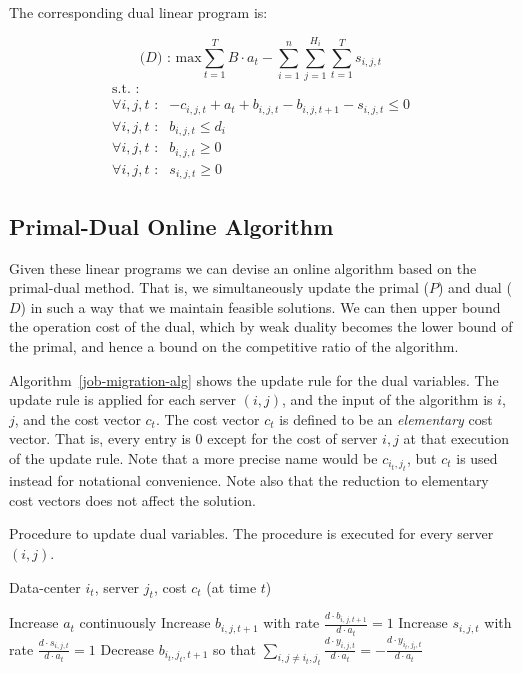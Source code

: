 The corresponding dual linear program is:

\[
\textrm{($D$) : max}   \sum^{T}_{t=1}B \cdot a_t - \sum^{n}_{i=1}\sum^{H_i}_{j=1}\sum^{T}_{t=1}s_{i,j,t}
\]
\[
	\begin{array}{rc}
	\textrm{s.t. :} & \\
		\forall i,j,t \textrm{ :}	    & -c_{i,j,t} + a_t + b_{i,j,t} - b_{i,j,t+1} - s_{i,j,t} \leq 0 \\
		\forall i,j,t \textrm{ :}	    & b_{i,j,t} \leq d_i \\
		\forall i,j,t \textrm{ :}	    & b_{i,j,t} \geq 0 \\
		\forall i,j,t \textrm{ :}	    & s_{i,j,t} \geq 0
	\end{array}
\]

\subsection{Primal-Dual Online Algorithm}
\label{pd-alg}

Given these  linear programs we can devise an online algorithm based on the primal-dual method.
That is, we simultaneously update the primal ($P$) and dual ($D$) in such a way that we maintain feasible solutions.
We can then upper bound the operation cost of the dual, which by weak duality becomes the lower bound of the primal, and hence a bound on the competitive ratio of the algorithm.

Algorithm~\ref{job-migration-alg} shows the update rule for the dual variables.
The update rule is applied for each server $(i,j)$, and the input of the algorithm is $i$, $j$, and the cost vector $c_t$. 
The cost vector $c_t$ is defined to be an \emph{elementary} cost vector. That is, every entry is $0$ except for the cost of server $i,j$ at that execution of the update rule.
Note that a more precise name would be $c_{i_t,j_t}$, but $c_t$ is used instead for notational convenience.
Note also that the reduction to elementary cost vectors does not affect the solution.

\begin{algorithm}
\caption{Procedure to update dual variables. The procedure is executed for every server $(i,j)$.}
\label{job-migration-alg}
\begin{algorithmic}[1]
\REQUIRE Data-center $i_t$, server $j_t$, cost $c_t$ (at time $t$)

 \STATE Increase $a_t$ continuously 
  \STATE Increase $b_{i,j,t+1}$ with rate $\frac{d \cdot b_{i,j,t+1}}{d \cdot a_t} = 1$
 \ENDFOR
  \STATE Increase $s_{i,j,t}$ with rate $\frac{d \cdot s_{i,j,t}}{d \cdot a_t}=1$
 \ENDFOR
  \STATE Decrease $b_{i_t,j_t,t+1}$ so that $\sum_{i,j \neq i_t,j_t}\frac{d \cdot y_{i,j,t}}{d \cdot a_t} = -\frac{d \cdot y_{i_t,j_t,t}}{d \cdot a_t}$
 \ENDFOR
\ENDWHILE
\end{algorithmic}
\end{algorithm}

